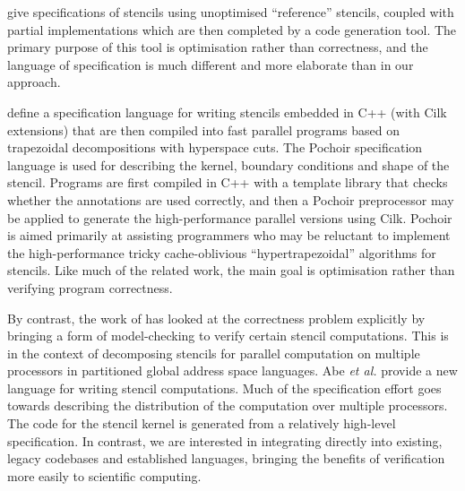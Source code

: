 \documentclass[10pt,preprint,numbers]{sigplanconf}
\theoremstyle{definition}
\begin{document}
\citet{Solar-Lezama:2007:PLDI} give specifications of stencils using
unoptimised ``reference'' stencils, coupled with partial
implementations which are then completed by a code
generation tool. %
The primary purpose of this tool is optimisation rather than
correctness, and the language of specification is much different and
more elaborate than in our approach.

\citet{Tang:2011:SPAA} define a specification language for writing
stencils embedded in C++ (with Cilk~\citep{blumofe1996cilk} extensions) that
are then compiled
into fast parallel programs based on trapezoidal decompositions with
hyperspace cuts. The Pochoir specification language is used for
describing the kernel, boundary conditions and shape of the
stencil. Programs are first compiled in C++ with a template library
that checks whether the annotations are used correctly, and then a
Pochoir preprocessor may be applied to generate the high-performance
parallel versions using Cilk.  Pochoir
is aimed primarily at assisting programmers who may be reluctant to
implement the high-performance tricky cache-oblivious
``hypertrapezoidal'' algorithms for stencils. 
Like much of the related work, the main goal 
is optimisation rather than verifying program correctness.

By contrast, the work of \citet{Abe:2013:IPDPSW} has looked at the
correctness problem explicitly by bringing a form of model-checking to
verify certain stencil computations. This is in the context of
decomposing stencils for parallel computation on multiple processors
 in partitioned global address
space languages. %
Abe \emph{et al.} provide a new language for writing stencil computations. Much of the specification
effort goes towards describing the distribution of the
computation over multiple processors. The code for the stencil kernel
is generated from a relatively high-level specification. 
In contrast, we are interested in integrating directly
into existing, legacy codebases and established languages, bringing
the benefits of verification more easily to scientific computing.%
\end{document}
